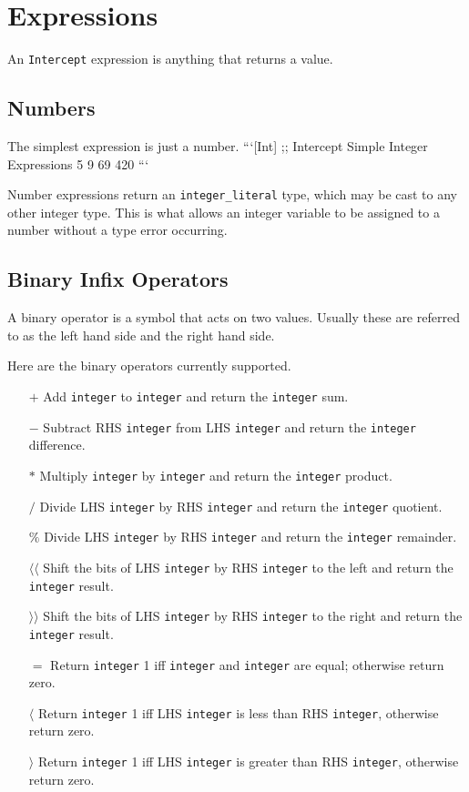 \documentclass[12pt]{report}
\begin{document}
\chapter{Expressions}
\label{chpt:expressions}

An \verb|Intercept| expression is anything that returns a value.

\section{Numbers}
\label{sec:expressions-numbers}

The simplest expression is just a number.
```[Int]
;; Intercept Simple Integer Expressions
5
9
69
420
```

Number expressions return an \verb|integer_literal| type, which may be cast to any other integer type. This is what allows an integer variable to be assigned to a number without a type error occurring.

\section{Binary Infix Operators}
\label{subsec:expressions-binary_infix_operators}

A binary operator is a symbol that acts on two values. Usually these are referred to as the left hand side and the right hand side.

Here are the binary operators currently supported.

\begin{itemize}

\item[$+$]
  Add \verb|integer| to \verb|integer| and return the \verb|integer| sum.
\item[$-$]
  Subtract RHS \verb|integer| from LHS \verb|integer| and return the \verb|integer| difference.
\item[$*$]
  Multiply \verb|integer| by \verb|integer| and return the \verb|integer| product.
\item[$/$]
 Divide LHS \verb|integer| by RHS \verb|integer| and return the \verb|integer| quotient.
\item[$\%$]
 Divide LHS \verb|integer| by RHS \verb|integer| and return the \verb|integer| remainder.

\item[$\langle\langle$]
 Shift the bits of LHS \verb|integer| by RHS \verb|integer| to the left and return the \verb|integer| result.
\item[$\rangle\rangle$]
 Shift the bits of LHS \verb|integer| by RHS \verb|integer| to the right and return the \verb|integer| result.

\item[$=$]
 Return \verb|integer| 1 iff \verb|integer| and \verb|integer| are equal; otherwise return zero.
\item[$\langle$]
 Return \verb|integer| 1 iff LHS \verb|integer| is less than RHS \verb|integer|, otherwise return zero.
\item[$\rangle$]
 Return \verb|integer| 1 iff LHS \verb|integer| is greater than RHS \verb|integer|, otherwise return zero.
\end{itemize}
\end{document}

